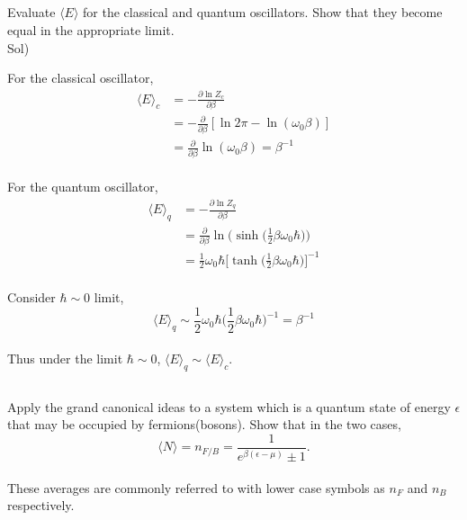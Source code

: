 \documentclass[paper=a4, fontsize=11pt]{scrartcl}
\numberwithin{equation}{section}
\numberwithin{figure}{section}
\numberwithin{table}{section}
\newcommand{\pder}[2]{\frac{\partial #1}{\partial #2}}
\newcommand{\expval}[1]{\langle #1 \rangle}
\newenvironment{problem}{\subsection{}}{}
\newenvironment{solution}{Sol) \begin{adjustwidth}{0.2in}{}\vspace{0.1in}}{\end{adjustwidth}}
\begin{document}
\vskip 0.5in

\begin{problem}
	Evaluate $\expval{E}$ for the classical and quantum oscillators. Show that they become equal in the appropriate limit.
\end{problem}\\

\begin{solution}
	For the classical oscillator,\\
	\begin{equation}
	\begin{split}
		\expval{E}_{c} &=  - \pder{\ln Z_{c}}{\beta} \\
		&= - \pder{}{\beta} [\ln 2\pi - \ln (\omega_{0}\beta)] \\
		&=  \pder{}{\beta} \ln (\omega_{0}\beta) = \beta^{-1}
	\end{split}
	\end{equation}\\
	For the quantum oscillator, \\
	\begin{equation}
		\begin{split}
		 \expval{E}_{q} &=  - \pder{\ln Z_{q}}{\beta} \\
		 &= \pder{}{\beta} \ln\bigg(\sinh\bigg(\frac{1}{2}\beta\omega_{0}\hbar\bigg)\bigg) \\
		 &= \frac{1}{2}\omega_{0}\hbar \bigg[\tanh\bigg(\frac{1}{2}\beta\omega_{0}\hbar\bigg)\bigg]^{-1}
		\end{split}
	\end{equation} \\
	\vskip 0.2in
	Consider $\hbar \sim 0$ limit,\\ 
	\begin{equation}
		\expval{E}_{q}  \sim \frac{1}{2}\omega_{0}\hbar \bigg(\frac{1}{2}\beta\omega_{0}\hbar\bigg)^{-1} = \beta^{-1}
	\end{equation}\\
	Thus under the limit $\hbar \sim 0$, $\expval{E}_{q} \sim \expval{E}_{c}$. 
	
\end{solution}

\vskip 0.5in

\begin{problem}
	Apply the grand canonical ideas to a system which is a quantum state of energy $\epsilon$ that may be occupied by fermions(bosons). Show that in the two cases, \\[3pt]
	\begin{equation}
		\expval{N}=n_{F/B}=\frac{1}{e^{\beta(\epsilon-\mu)}\pm 1}. \nonumber
	\end{equation} \\[3pt]
	These averages are commonly referred to with lower case symbols as $n_F$ and $n_B$ respectively.
\end{problem} \\
\end{document}
